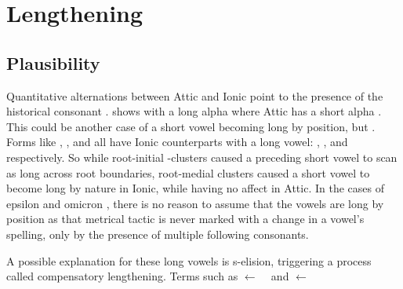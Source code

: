 \section{Lengthening}\label{sec:Lengthening}

\subsection{Plausibility}\label{subsec:Plausibility}
Quantitative alternations between Attic and Ionic point to the presence of the historical
consonant \w.  shows  with a long alpha  where
Attic has a short alpha . This could be another case of a short vowel becoming long by position,
but . Forms like
, , and  all have Ionic counterparts with a long vowel:
, , and  respectively. So while root-initial \w-clusters caused
a preceding short vowel to scan as long across root boundaries, root-medial clusters caused a
short vowel to become long by nature in Ionic, while having no affect in Attic.
In the cases of epsilon  and omicron , there is no reason to assume that the vowels are long by position
as that metrical tactic is never marked with a change in a vowel's spelling, only by the
presence of multiple following consonants.

A possible explanation for these long vowels is s-elision, triggering a process called
compensatory lengthening. Terms such as  $\gets$ \CH\  and  $\gets$ 